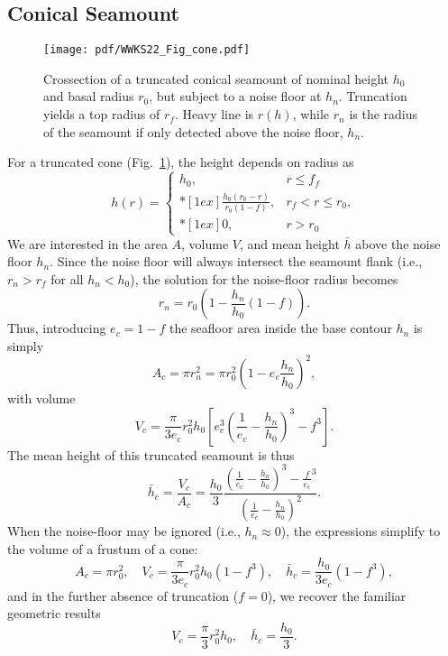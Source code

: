 \subsection{Conical Seamount}

\begin{figure}[h]
\centering
\texttt{[image: pdf/WWKS22\_Fig\_cone.pdf]}
\caption{Crossection of a truncated conical seamount of nominal height $h_0$ and basal radius $r_0$, but subject
to a noise floor at $h_n$.  Truncation yields a top radius of $r_f$. Heavy line is $r(h)$, while $r_n$ is the
radius of the seamount if only detected above the noise floor, $h_n$.}
\label{WWKS22_Fig_cone}
\end{figure}
For a truncated cone (Fig.~\ref{WWKS22_Fig_cone}), the height depends on radius as
\begin{equation*}
h(r) = \left \{ \begin{array}{cl}
	h_0, &	r \leq f_f \\*[1ex]
	\displaystyle \frac{h_0 (r_0 - r)}{r_0 (1-f)}, & r_f < r \leq r_0, \\*[1ex]
	0, & r > r_0
\end{array} \right.
\end{equation*}
We are interested in the area $A$, volume $V$, and mean height $\bar{h}$ above the noise floor $h_n$.
Since the noise floor will always intersect the seamount flank (i.e., $r_n > r_f$ for all $h_n < h_0$),
the solution for the noise-floor radius becomes
\begin{equation*}
r_n = r_0 \left ( 1 - \frac{h_n}{h_0}(1 - f) \right ).
\end{equation*}
Thus, introducing $e_c = 1 -f$ the seafloor area inside the base contour $h_n$ is simply
\begin{equation}
A_c = \pi r_n^2 = \pi r_0^2 \left ( 1 - e_c\frac{h_n}{h_0} \right )^2,
\end{equation}
with volume
\begin{equation}
V_c = \frac{\pi}{3e_c}r_0^2h_0 \left [ e_c^3 \left (\frac{1}{e_c} - \frac{h_n}{h_0} \right )^3 - f^3 \right ].
\end{equation}
The mean height of this truncated seamount is thus
\begin{equation}
\bar{h}_c =  \frac{V_c}{A_c} = \frac{h_0}{3} \frac{\left (\frac{1}{e_c} - \frac{h_n}{h_0} \right )^3 - \frac{f}{e_c}^3}{\left (\frac{1}{e_c} - \frac{h_n}{h_0} \right)^2}.
\end{equation}
When the noise-floor may be ignored (i.e., $h_n \approx 0$), the expressions simplify to the volume of a frustum of a cone:
\begin{equation*}
A_c = \pi r_0^2,	\quad V_c = \frac{\pi}{3e_c}r_0^2h_0 \left (1 - f^3 \right ), \quad \bar{h}_c =  \frac{h_0}{3e_c}\left (1 - f^3 \right ),
\end{equation*}
and in the further absence of truncation ($f = 0$), we recover the familiar geometric results
\begin{equation*}
V_c = \frac{\pi}{3}r_0^2h_0, \quad \bar{h}_c =  \frac{h_0}{3}.
\end{equation*}

